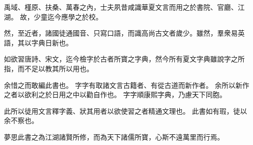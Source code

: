 禹域、槿原、扶桑、萬春之內，士夫夙昔咸識華夏文言而用之於書院、官廳、江湖。
故，少童迄今應學之於校。

然，至近者，諸國徒通國音、只寫口語，而識高尚古文者歲少。雖然，羣衆易英語，其以字典日新也。

如欲習唐詩、宋文，迄今檢字於古者所寶之字典，然今所有夏文字典雖說字之所指，而不足以教其所以用也。

余惜之而敢編此書也。
字字有取諸文言古籍者、有從古道而新作者。
余所以新作之者以欲利之於日用之中以勸自作也。
字字順康熙字典，乃慮天下同胞。

此所以徒用文言釋字義、狀其用者以欲使習之者精通文理也。
此書如有瑕，徒以余不察也。

夢思此書之為江湖諸賢所修，而為天下諸儒所寶，心斯不遠萬里而行焉。
